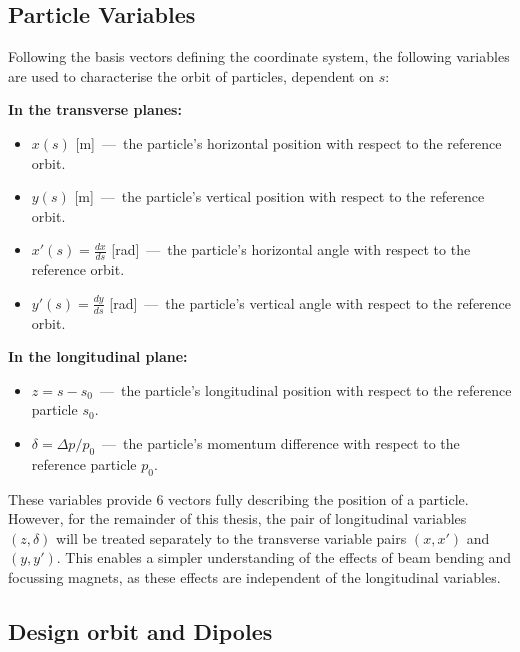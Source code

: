 \documentclass[11pt]{report}
\begin{document}
\subsection{Particle Variables}

Following the basis vectors defining the coordinate system, the following variables are used to characterise the orbit of particles, dependent on $s$:

\noindent \textbf{In the transverse planes:}
\begin{itemize}
  \item $x(s)$ [m]~---~the particle's horizontal position with respect to the reference orbit.
  \item $y(s)$ [m]~---~the particle's vertical position with respect to the reference orbit.
  \item $x'(s)=\frac{dx}{ds}$ [rad]~---~the particle's horizontal angle with respect to the reference orbit.
  \item $y'(s)=\frac{dy}{ds}$ [rad]~---~the particle's vertical angle with respect to the reference orbit.
\end{itemize}
\textbf{In the longitudinal plane:}
\begin{itemize}
    \item $z=s-s_0$~---~the particle's longitudinal position with respect to the reference particle $s_0$.
    \item $\delta = \Delta p/p_0$~---~the particle's momentum difference with respect to the reference particle $p_0$.
\end{itemize} 

These variables provide 6 vectors fully describing the position of a particle. However, for the remainder of this thesis, the pair of longitudinal variables $(z, \delta)$ will be treated separately to the transverse variable pairs $(x, x')$ and $(y, y')$. This enables a simpler understanding of the effects of beam bending and focussing magnets, as these effects are independent of the longitudinal variables.

\subsection{Design orbit and Dipoles}
\end{document}
